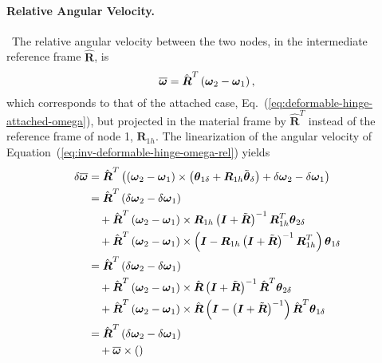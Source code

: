 \documentclass[10pt,dvips,fleqn]{report}
\newcommand{\T}[1]{\boldsymbol{#1}}
\newcommand{\TT}[1]{\boldsymbol{#1}}
\begin{document}
\paragraph{Relative Angular Velocity.} \
The relative angular velocity between the two nodes,
in the intermediate reference frame $\hat{\T{R}}$, is
\begin{equation}
	\overline{\T{\omega}} = \hat{\T{R}}^T \plbr{\T{\omega}_2 - \T{\omega}_1}
	\label{eq:inv-deformable-hinge-omega-rel} ,
\end{equation}
which corresponds to that of the attached case,
Eq.~(\ref{eq:deformable-hinge-attached-omega}),
but projected in the material frame by $\hat{\TT{R}}^T$
instead of the reference frame of node 1, $\T{R}_{1h}$.
The linearization of the angular velocity 
of Equation~(\ref{eq:inv-deformable-hinge-omega-rel}) yields
\begin{align}
	\delta\overline{\T{\omega}}
	&= \hat{\T{R}}^T \plbr{
		\plbr{\T{\omega}_2 - \T{\omega}_1} \times \plbr{\T{\theta}_{1\delta} + \T{R}_{1h} \tilde{\T{\theta}}_{\delta}}
		+ \delta\T{\omega}_2 - \delta\T{\omega}_1
	} \\
	&= \hat{\T{R}}^T \plbr{
		\delta\T{\omega}_2 - \delta\T{\omega}_1
	} \nonumber \\
	& \mbox{\hspace{10pt}} + \hat{\T{R}}^T \plbr{\T{\omega}_2 - \T{\omega}_1} \times 
			\T{R}_{1h}\plbr{\T{I} + \tilde{\T{R}}}^{-1} \T{R}_{1h}^T \T{\theta}_{2\delta} \nonumber \\
	& \mbox{\hspace{10pt}} + \hat{\T{R}}^T \plbr{\T{\omega}_2 - \T{\omega}_1} \times
			\plbr{\T{I} - \T{R}_{1h}\plbr{\T{I} + \tilde{\T{R}}}^{-1} \T{R}_{1h}^T} \T{\theta}_{1\delta} \\
	&= \hat{\T{R}}^T \plbr{
		\delta\T{\omega}_2 - \delta\T{\omega}_1
	} \nonumber \\
	& \mbox{\hspace{10pt}} + \hat{\T{R}}^T \plbr{\T{\omega}_2 - \T{\omega}_1} \times 
			\hat{\T{R}}\plbr{\T{I} + \tilde{\T{R}}}^{-1} \hat{\T{R}}^T \T{\theta}_{2\delta} \nonumber \\
	& \mbox{\hspace{10pt}} + \hat{\T{R}}^T \plbr{\T{\omega}_2 - \T{\omega}_1} \times
			\hat{\T{R}}\plbr{\T{I} - \plbr{\T{I} + \tilde{\T{R}}}^{-1}} \hat{\T{R}}^T \T{\theta}_{1\delta} \\
	&= \hat{\T{R}}^T \plbr{
		\delta\T{\omega}_2 - \delta\T{\omega}_1
	} \nonumber \\
	& \mbox{\hspace{10pt}} + \overline{\T{\omega}} \times \plbr{
}
\end{align}
\end{document}
